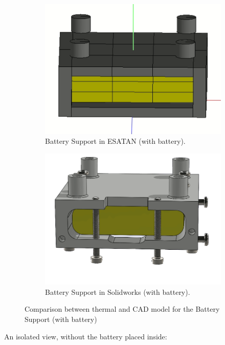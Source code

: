 \begin{figure}[H]
    \centering
    \begin{subfigure}{.5\textwidth}
      \centering
      \includegraphics[width=.6\linewidth]{res/img/5_simulationanalisys/Comparisons/ESATAN/BatterySupport.PNG}
      \caption{Battery Support in ESATAN (with battery).}
      \label{fig:batterysupport}
    \end{subfigure}%
    \begin{subfigure}{.5\textwidth}
      \centering
      \includegraphics[width=.5\linewidth]{res/img/5_simulationanalisys/Comparisons/SLDW/BatterySupport_Solid.PNG}
      \caption{Battery Support in Solidworks (with battery).}
      \label{fig:batterysupportsolid}
    \end{subfigure}
    \caption{Comparison between thermal and CAD model for the Battery Support (with battery)}
    \label{fig:batterysupportim}
\end{figure}

An isolated view, without the battery placed inside:

